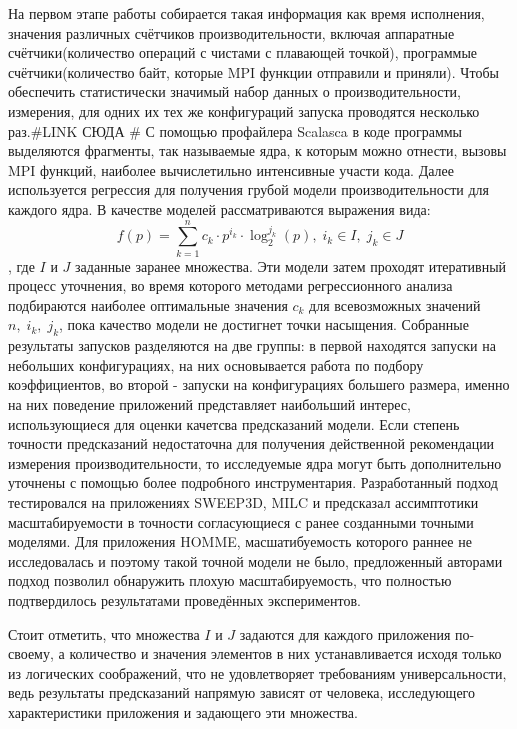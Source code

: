 		На первом этапе работы собирается такая информация как время исполнения, значения различных счётчиков производительности, включая аппаратные счётчики(количество операций с чистами с плавающей точкой), программые счётчики(количество байт, которые MPI функции отправили и приняли). Чтобы обеспечить статистически значимый набор данных о производительности, измерения, для одних их тех же конфигураций запуска проводятся несколько раз.\#LINK СЮДА \#\label{several_times_test} С помощью профайлера Scalasca в коде программы выделяются фрагменты, так называемые ядра, к которым можно отнести, вызовы MPI функций, наиболее вычислетильно интенсивные участи кода. Далее используется регрессия для получения грубой модели производительности для каждого ядра. В качестве моделей рассматриваются выражения вида:
		\begin{equation}
		f(p) = \sum \limits_{k=1}^{n} c_k \cdot p^{i_k} \cdot \log_2^{j_k}(p),\; i_k \in I,\; j_k \in J 
		\end{equation}, где \(I\) и \(J\) заданные заранее множества. Эти модели затем проходят итеративный процесс уточнения, во время которого методами регрессионного анализа подбираются наиболее оптимальные значения \(c_k\) для всевозможных значений \(n,\;i_{k},\;j_{k}\), пока качество модели не достигнет точки насыщения. Собранные результаты запусков разделяются на две группы: в первой находятся запуски на небольших конфигурациях, на них основывается работа по подбору коэффициентов, во второй - запуски на конфигурациях большего размера, именно на них поведение приложений представляет наибольший интерес, использующиеся для оценки качетсва предсказаний модели. Если степень точности предсказаний недостаточна для получения действенной рекомендации измерения производительности, то исследуемые ядра могут быть дополнительно уточнены с помощью более подробного инструментария. Разработанный подход тестировался на приложениях SWEEP3D, MILC и предсказал ассимптотики масштабируемости в точности согласующиеся с ранее созданными точными моделями. Для приложения HOMME, масшатибуемость которого раннее не исследовалась и поэтому такой точной модели не было, предложенный авторами подход позволил обнаружить плохую масштабируемость, что полностью подтвердилось результатами проведённых экспериментов.

		Стоит отметить, что множества \(I\) и \(J\) задаются для каждого приложения по-своему, а количество и значения элементов в них устанавливается исходя только из логических соображений, что не удовлетворяет требованиям универсальности, ведь результаты предсказаний напрямую зависят от человека, исследующего характеристики приложения и задающего эти множества.



